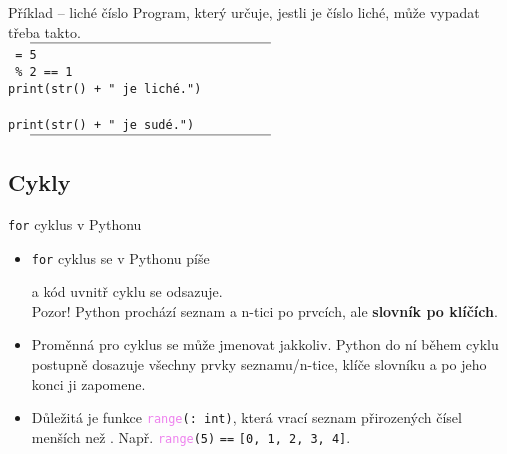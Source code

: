 \begin{frame}{Příklad -- liché číslo}
 Program, který určuje, jestli je číslo liché, může vypadat třeba takto.
 $\vcenter{\rule{.5\textwidth}{0.4pt}}$\\
 \texttt{ = 5}\\
 \texttt{  \% 2 == 1\mlb{:}}\\
 \hspace{4ex}\texttt{print(str() + "~je liché.")}\\
 \texttt{}\\
 \hspace{4ex}\texttt{print(str() + "~je sudé.")}\\
 $\vcenter{\rule{.5\textwidth}{0.4pt}}$
\end{frame}

\subsection[Cykly]{Cykly}

\begin{frame}{\texttt{for} cyklus v Pythonu}
 \begin{itemize}
  \item<1-> \texttt{for} cyklus se v Pythonu píše
   \begin{center}
   \end{center}
   a kód uvnitř cyklu se odsazuje.\\
   \alert{Pozor!} Python prochází seznam a n-tici po prvcích, ale
   \textbf{slovník po klíčích}.
  \item<2-> Proměnná pro cyklus se může jmenovat jakkoliv. Python do ní během
   cyklu postupně dosazuje všechny prvky seznamu/n-tice, klíče slovníku a po
   jeho konci ji zapomene.
  \item<3-> Důležitá je funkce \texttt{\textcolor{violet}{range}(: int)},
   která vrací seznam přirozených čísel menších než \texttt{}. Např.
   \texttt{\textcolor{violet}{range}(5)} \texttt{==} \texttt{[0, 1, 2, 3, 4]}.
 \end{itemize}
\end{frame}

